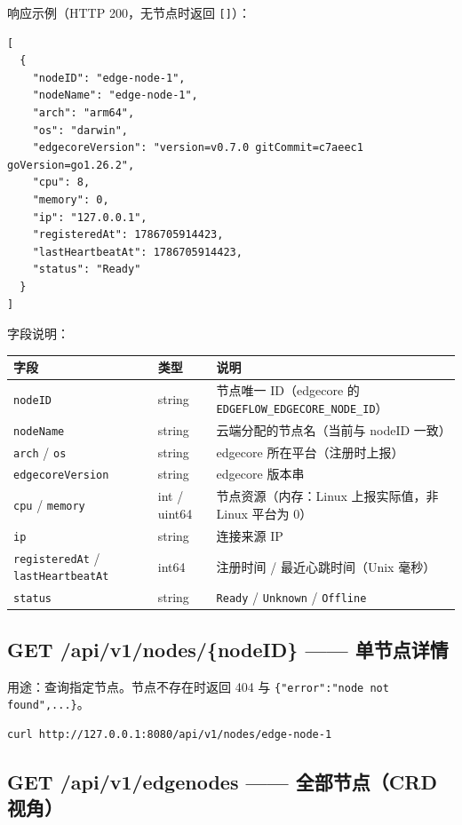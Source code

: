 响应示例（HTTP 200，无节点时返回 \texttt{[]}）：

\begin{lstlisting}
[
  {
    "nodeID": "edge-node-1",
    "nodeName": "edge-node-1",
    "arch": "arm64",
    "os": "darwin",
    "edgecoreVersion": "version=v0.7.0 gitCommit=c7aeec1 goVersion=go1.26.2",
    "cpu": 8,
    "memory": 0,
    "ip": "127.0.0.1",
    "registeredAt": 1786705914423,
    "lastHeartbeatAt": 1786705914423,
    "status": "Ready"
  }
]
\end{lstlisting}

字段说明：

\begin{tabularx}{\textwidth}{l l X}
  \toprule
  \textbf{字段} & \textbf{类型} & \textbf{说明} \\
  \midrule
  \texttt{nodeID} & string & 节点唯一 ID（edgecore 的 \texttt{EDGEFLOW\_EDGECORE\_NODE\_ID}） \\
  \texttt{nodeName} & string & 云端分配的节点名（当前与 nodeID 一致） \\
  \texttt{arch} / \texttt{os} & string & edgecore 所在平台（注册时上报） \\
  \texttt{edgecoreVersion} & string & edgecore 版本串 \\
  \texttt{cpu} / \texttt{memory} & int / uint64 & 节点资源（内存：Linux 上报实际值，非 Linux 平台为 0） \\
  \texttt{ip} & string & 连接来源 IP \\
  \texttt{registeredAt} / \texttt{lastHeartbeatAt} & int64 & 注册时间 / 最近心跳时间（Unix 毫秒） \\
  \texttt{status} & string & \texttt{Ready} / \texttt{Unknown} / \texttt{Offline} \\
  \bottomrule
\end{tabularx}

\subsection{GET /api/v1/nodes/\{nodeID\} —— 单节点详情}

用途：查询指定节点。节点不存在时返回 404 与 \texttt{\{"error":"node not found",...\}}。

\begin{lstlisting}
curl http://127.0.0.1:8080/api/v1/nodes/edge-node-1
\end{lstlisting}

\subsection{GET /api/v1/edgenodes —— 全部节点（CRD 视角）}

